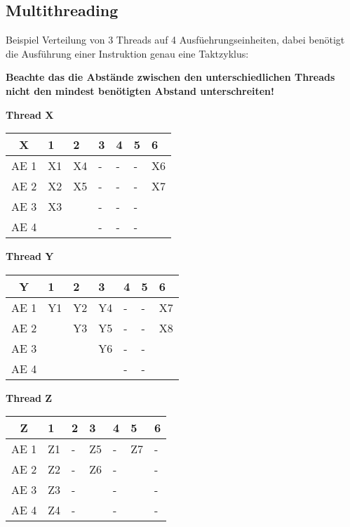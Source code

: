 \documentclass
[
	8pt,		%
	ngerman,	%
	a4paper,	%
	landscape,	%
	final		%
]{extarticle}
\begin{document}
\begin{multicols*}{4}
\section{Multithreading}
Beispiel Verteilung von 3 Threads auf 4 Ausfüehrungseinheiten, dabei
benötigt die Ausführung einer Instruktion genau eine Taktzyklus: \par
\textbf{Beachte das die Abstände zwischen den unterschiedlichen Threads
nicht den mindest benötigten Abstand unterschreiten!}
\par\vspace{\abovedisplayskip}

\textbf{Thread X}\par\vspace{\abovedisplayskip}
\begin{tabularx}{\linewidth}{|c|XXXXXX|}\hline
	X    & 1  & 2  & 3 & 4 & 5 & 6  \\\hline
	AE 1 & X1 & X4 & - & - & - & X6 \\
	AE 2 & X2 & X5 & - & - & - & X7 \\
	AE 3 & X3 &    & - & - & - &    \\
	AE 4 &    &    & - & - & - &    \\\hline
\end{tabularx}\par\vspace{\belowdisplayskip}

\textbf{Thread Y}\par\vspace{\abovedisplayskip}
\begin{tabularx}{\linewidth}{|c|XXXXXX|}\hline
	Y    & 1  & 2  & 3  & 4 & 5 & 6  \\\hline
	AE 1 & Y1 & Y2 & Y4 & - & - & X7 \\
	AE 2 &    & Y3 & Y5 & - & - & X8 \\
	AE 3 &    &    & Y6 & - & - &    \\
	AE 4 &    &    &    & - & - &    \\\hline
\end{tabularx}\par\vspace{\belowdisplayskip}

\textbf{Thread Z}\par\vspace{\abovedisplayskip}
\begin{tabularx}{\linewidth}{|c|XXXXXX|}\hline
	Z    & 1  & 2 & 3  & 4 & 5  & 6 \\\hline
	AE 1 & Z1 & - & Z5 & - & Z7 & - \\
	AE 2 & Z2 & - & Z6 & - &    & - \\
	AE 3 & Z3 & - &    & - &    & - \\
	AE 4 & Z4 & - &    & - &    & - \\\hline
\end{tabularx}\par\vspace{\belowdisplayskip}

\end{multicols*}
\end{document}
